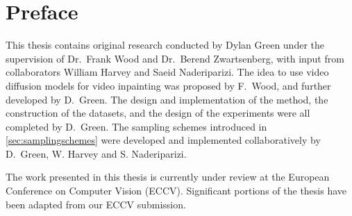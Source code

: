 
\chapter{Preface}
This thesis contains original research conducted by Dylan Green under the supervision of Dr.\ Frank Wood and Dr.\ Berend Zwartsenberg, with input from collaborators William Harvey and Saeid Naderiparizi. The idea to use video diffusion models for video inpainting was proposed by F.\ Wood, and further developed by D.\ Green. The design and implementation of the method, the construction of the datasets, and the design of the experiments were all completed by D.\ Green. The sampling schemes introduced in \cref{sec:samplingschemes} were developed and implemented collaboratively by D.\ Green, W. Harvey and S. Naderiparizi. 

The work presented in this thesis is currently under review at the European 
Conference on Computer Vision (ECCV). Significant portions of the thesis have been adapted from our ECCV submission. 